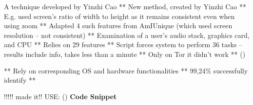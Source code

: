 A technique developed by Yinzhi Cao
**	New method, created by Yinzhi Cao
**	E.g. used screen’s ratio of width to height as it remains consistent even when using zoom
**	Adapted 4 such features from AmIUnique (which used screen resolution – not consistent)
**	Examination of a user’s audio stack, graphics card, and CPU
**	Relies on 29 features
**	Script forces system to perform 36 tasks – results include info, takes less than a minute
**	Only on Tor it didn’t work
**	(\textcite{nordrum17})

**	Rely on corresponding OS and hardware functionalities
**	99,24\%  successfully identify
**	%


!!!!!
made it!!
USE: (\textcite{Cao17})
\textbf{Code Snippet}

%

